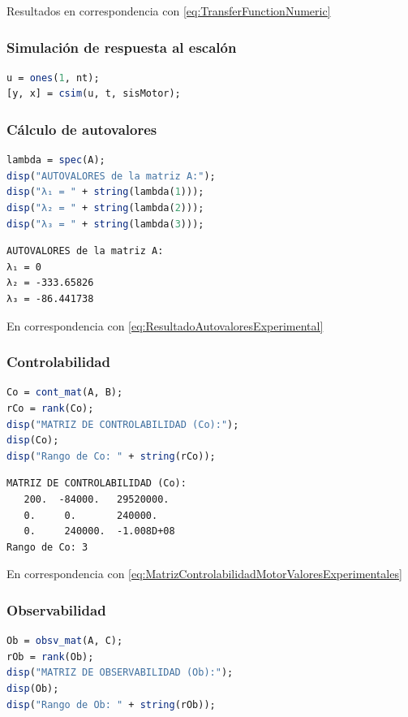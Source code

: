 Resultados en correspondencia con \eqref{eq:TransferFunctionNumeric}

\subsubsection{Simulación de respuesta al escalón}
\begin{lstlisting}[language=Scilab]
u = ones(1, nt);
[y, x] = csim(u, t, sisMotor);
\end{lstlisting}

\subsubsection{Cálculo de autovalores}
\begin{lstlisting}[language=Scilab]
lambda = spec(A);
disp("AUTOVALORES de la matriz A:");
disp("λ₁ = " + string(lambda(1)));
disp("λ₂ = " + string(lambda(2)));
disp("λ₃ = " + string(lambda(3)));
\end{lstlisting}

\begin{lstlisting}[style=outputstyle]
AUTOVALORES de la matriz A:
λ₁ = 0
λ₂ = -333.65826
λ₃ = -86.441738
\end{lstlisting}

En correspondencia con \eqref{eq:ResultadoAutovaloresExperimental}

\subsubsection{Controlabilidad}
\begin{lstlisting}[language=Scilab]
Co = cont_mat(A, B);
rCo = rank(Co);
disp("MATRIZ DE CONTROLABILIDAD (Co):");
disp(Co);
disp("Rango de Co: " + string(rCo));
\end{lstlisting}

\begin{lstlisting}[style=outputstyle]
MATRIZ DE CONTROLABILIDAD (Co):
   200.  -84000.   29520000.
   0.     0.       240000.
   0.     240000.  -1.008D+08
Rango de Co: 3
\end{lstlisting}

En correspondencia con \eqref{eq:MatrizControlabilidadMotorValoresExperimentales}

\subsubsection{Observabilidad}
\begin{lstlisting}[language=Scilab]
Ob = obsv_mat(A, C);
rOb = rank(Ob);
disp("MATRIZ DE OBSERVABILIDAD (Ob):");
disp(Ob);
disp("Rango de Ob: " + string(rOb));
\end{lstlisting}

